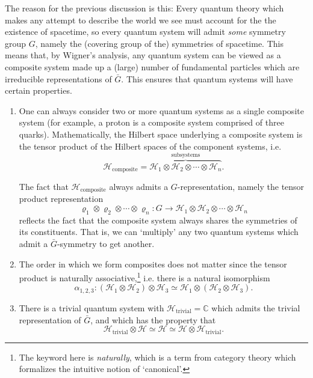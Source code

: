 \documentclass[a4paper]{report}
\newcommand{\C}{\mathbb{C}}
\theoremstyle{definition}
\theoremstyle{plain}
\theoremstyle{remark}
\begin{document}
The reason for the previous discussion is this: Every quantum theory which makes any attempt to describe the world we see must account for the the existence of spacetime, so every quantum system will admit \emph{some} symmetry group $G$, namely the (covering group of the) symmetries of spacetime. This means that, by Wigner's analysis, any quantum system can be viewed as a composite system made up a (large) number of fundamental particles which are irreducible representations of $\bar{G}$. This ensures that quantum systems will have certain properties. 
\begin{enumerate}
  \item One can always consider two or more quantum systems as a single composite system (for example, a proton is a composite system comprised of three quarks). Mathematically, the Hilbert space underlying a composite system is the tensor product of the Hilbert spaces of the component systems, i.e. 
    \begin{equation*}
      \mathscr{H}_{\text{composite}} = \overbrace{\mathscr{H}_{1} \otimes \mathscr{H}_{2} \otimes \cdots \otimes \mathscr{H}_{n}}^{\text{subsystems}}.
    \end{equation*}

    The fact that $\mathscr{H}_{\text{composite}}$ always admits a $G$-representation, namely the tensor product representation
    \begin{equation*}
      \varrho_{1} \otimes \varrho_{2} \otimes \cdots \otimes \varrho_{n} \colon G \to \mathscr{H}_{1} \otimes \mathscr{H}_{2} \otimes \cdots \otimes \mathscr{H}_{n}
    \end{equation*}
    reflects the fact that the composite system always shares the symmetries of its constituents. That is, we can `multiply' any two quantum systems which admit a $\bar{G}$-symmetry to get another. 

  \item The order in which we form composites does not matter since the tensor product is naturally associative,\footnote{The keyword here is \emph{naturally}, which is a term from category theory which formalizes the intuitive notion of `canonical'.} i.e. there is a natural isomorphism
    \begin{equation*}
      \alpha_{1,2,3}\colon (\mathscr{H}_{1} \otimes \mathscr{H}_{2}) \otimes \mathscr{H}_{3} \simeq \mathscr{H}_{1} \otimes (\mathscr{H}_{2} \otimes \mathscr{H}_{3}).
    \end{equation*}

  \item There is a trivial quantum system with $\mathscr{H}_{\text{trivial}} = \C$ which admits the trivial representation of $\bar{G}$, and which has the property that
    \begin{equation*}
      \mathscr{H}_{\text{trivial}} \otimes \mathscr{H} \simeq \mathscr{H} \simeq \mathscr{H} \otimes \mathscr{H}_{\text{trivial}}.
    \end{equation*}
\end{enumerate}
\end{document}
